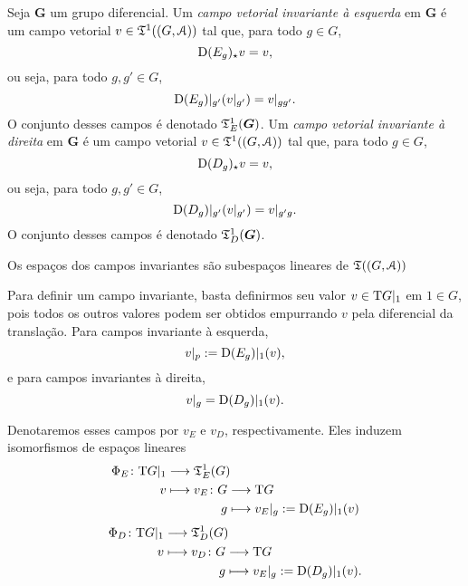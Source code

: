 \begin{definition}
Seja $\bm G$ um grupo diferencial. Um \emph{campo vetorial invariante à esquerda} em $\bm G$ é um campo vetorial $v \in \mathfrak{T}^1((G,\mathcal{A}))$ tal que, para todo $g \in G$,
	\begin{equation*}
	\mathrm{D}(E_{g})_\star v = v,
	\end{equation*}
ou seja, para todo $g,g' \in G$,
	\begin{equation*}
	\mathrm{D}(E_{g})|_{g'} (v|_{g'}) = v|_{gg'}.
	\end{equation*}
O conjunto desses campos é denotado $\mathfrak{T}^1_E(\bm G)$. Um \emph{campo vetorial invariante à direita} em $\bm G$ é um campo vetorial $v \in \mathfrak{T}^1((G,\mathcal{A}))$ tal que, para todo $g \in G$,
	\begin{equation*}
	\mathrm{D}(D_{g})_\star v = v,
	\end{equation*}
ou seja, para todo $g,g' \in G$,
	\begin{equation*}
	\mathrm{D}(D_{g})|_{g'} (v|_{g'}) = v|_{g'g}.
	\end{equation*}
O conjunto desses campos é denotado $\mathfrak{T}^1_D(\bm G)$.
\end{definition}


Os espaços dos campos invariantes são subespaços lineares de $\mathfrak{T}((G,\mathcal{A}))$

Para definir um campo invariante, basta definirmos seu valor $v \in \mathrm{T} G|_1$ em $1 \in G$, pois todos os outros valores podem ser obtidos empurrando $v$ pela diferencial da translação. Para campos invariante à esquerda,
	\begin{equation*}
	v|_p := \mathrm{D}(E_{g})|_{1} (v),
	\end{equation*}
e para campos invariantes à direita,
	\begin{equation*}
	v|_{g} = \mathrm{D}(D_{g})|_{1} (v).
	\end{equation*}

Denotaremos esses campos por $v_E$ e $v_D$, respectivamente. Eles induzem isomorfismos de espaços lineares
	\begin{align*}
	\func{\Phi_E}{\Tg G|_1}{\tens^1_E(G)}{v}{
		\begin{aligned}[t]
		\func{v_E}{G}{\Tg G}{g}{v_E|_g := \D(\trE{g})|_{1} (v)}
		\end{aligned}
	}
	\end{align*}
	\begin{align*}
	\func{\Phi_D}{\Tg G|_1}{\tens^1_D(G)}{v}{
		\begin{aligned}[t]
		\func{v_D}{G}{\Tg G}{g}{v_E|_g := \D(\trD{g})|_{1} (v)}.
		\end{aligned}
	}
	\end{align*}

